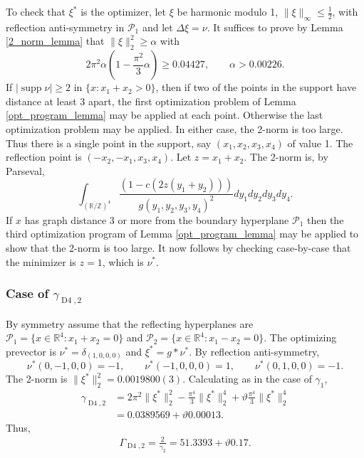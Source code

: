 \documentclass[a4paper, 12pt, notitlepage]{amsart}
\newcommand{\Dfour}{\operatorname{D4}}
\newcommand{\supp}{\operatorname{supp}}
\newcommand{\bR}{\mathbb{R}}
\newcommand{\zed}{\mathbb{Z}}
\newcommand{\sP}{{\mathscr{P}}}
\theoremstyle{remark}
\begin{document}
To check that $\xi^*$ is the optimizer, let $\xi$ be harmonic modulo 1, $\|\xi\|_\infty \leq \frac{1}{2}$, with reflection anti-symmetry in $\sP_1$ and let $\Delta \xi = \nu$.  It suffices to prove by Lemma \ref{2_norm_lemma} that  $\|\xi\|_2^2 \geq \alpha$ with 
\begin{equation}
 2\pi^2 \alpha\left(1 - \frac{\pi^2}{3}\alpha \right) \geq 0.04427, \qquad \alpha >0.00226. 
\end{equation}
If  $|\supp \nu| \geq 2$ in $\{x: x_1 + x_2 > 0\}$, then if two of the points in the support have distance at least 3 apart, the first optimization problem of Lemma \ref{opt_program_lemma} may be applied at each point.  Otherwise the last optimization problem may be applied.  In either case, the 2-norm is too large.  Thus there is a single point in the support, say $(x_1, x_2, x_3, x_4)$ of value 1.  The reflection point is $(-x_2, -x_1, x_3, x_4)$.  Let $z = x_1 + x_2$.  The 2-norm is, by Parseval,
\begin{equation}
 \int_{(\bR/\zed)^4} \frac{(1 - c(2z(y_1+y_2)))}{g(y_1, y_2, y_3, y_4)^2}dy_1dy_2dy_3dy_4.
\end{equation}
If $x$ has graph distance 3 or more from the boundary hyperplane $\sP_1$ then the third optimization program of Lemma \ref{opt_program_lemma} may be applied to show that the 2-norm is too large.  It now follows by checking case-by-case that the minimizer is $z = 1$, which is $\nu^*$.  


\subsubsection*{Case of $\gamma_{\Dfour,2}$}  By symmetry  assume that the reflecting hyperplanes are $\sP_1 = \{x \in \bR^4: x_1 + x_2 = 0\}$ and $\sP_2 = \{x \in \bR^4: x_1 - x_2 = 0\}$. The optimizing prevector is $\nu^* = \delta_{(1,0,0,0)}$ and $\xi^* = g* \nu^*$.  By reflection anti-symmetry, 
\begin{equation}
 \nu^*(0, -1, 0, 0) = -1, \qquad \nu^*(-1, 0, 0, 0) = 1, \qquad \nu^*(0, 1, 0, 0) = -1.
\end{equation}
The 2-norm is $\|\xi^*\|_2^2 = 0.0019800(3).$ Calculating as in the case of $\gamma_1$,
\begin{align*}
\gamma_{\Dfour,2}&= 2\pi^2 \|\xi^*\|_2^2 - \frac{\pi^4}{3}\|\xi^*\|_2^4 + \vartheta \frac{\pi^4}{3}\|\xi^*\|_2^4\\
 &=0.0389569 +\vartheta 0.00013.
\end{align*}
Thus,
\begin{align*}
 \Gamma_{\Dfour,2} =\frac{2}{\gamma_2} =  51.3393 + \vartheta 0.17.
\end{align*}
\end{document}
